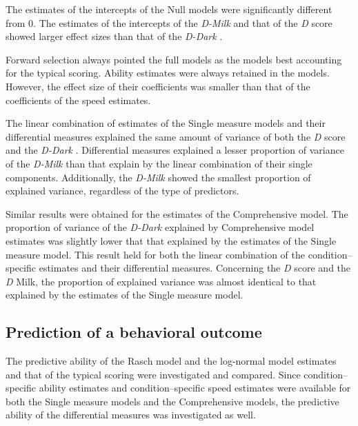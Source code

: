 \documentclass[12pt]{book}
\begin{document}
The estimates of the intercepts of the Null models were significantly different from 0. The estimates of the intercepts of the \emph{D-Milk} and that of the \emph{D} score showed larger effect sizes than that of the \emph{D-Dark} . 

Forward selection always pointed the full models as the models best accounting for the typical scoring. Ability estimates were always retained in the models. 
However, the effect size of their coefficients was smaller than that of the coefficients of the speed estimates.

The linear combination of estimates of the Single measure models and their differential measures explained the same amount of variance of both the \emph{D} score and the \emph{D-Dark} . 
Differential measures explained a lesser proportion of variance of the \emph{D-Milk} than that explain by the linear combination of their single components. Additionally, the \emph{D-Milk} showed the smallest proportion of explained variance, regardless of the type of predictors.

Similar results were obtained for the estimates of the Comprehensive model. 
	The proportion of variance of the \emph{D-Dark} explained by Comprehensive model estimates was slightly lower that that explained by the estimates of the Single measure model. This result held for both the linear combination of the condition--specific estimates and their differential measures.
	Concerning the \emph{D} score and the \emph{D} Milk, the proportion of explained variance was almost identical to that explained by the estimates of the Single measure model.

\subsection{Prediction of a behavioral outcome}

The predictive ability of the Rasch model and the log-normal model estimates and that of the typical scoring were investigated and compared. 
Since condition--specific ability estimates and condition--specific speed estimates were available for both the Single measure models and the Comprehensive models, the predictive ability of the differential measures was investigated as well. 
\end{document}
